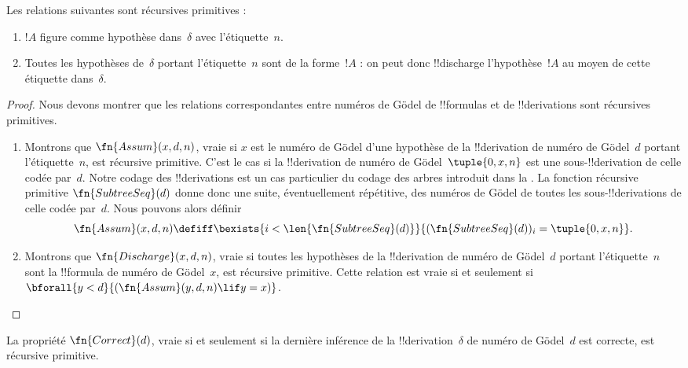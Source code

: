 \documentclass[../../../include/open-logic-section]{subfiles}
\begin{document}
\begin{prop}
  Les relations suivantes sont récursives primitives :
  \begin{enumerate}
  \item $!A$ figure comme hypothèse dans~$\delta$ avec l'étiquette~$n$.
  \item Toutes les hypothèses de~$\delta$ portant l'étiquette~$n$
    sont de la forme~$!A$ : on peut donc !!{discharge} l'hypothèse~$!A$
    au moyen de cette étiquette dans~$\delta$.
  \end{enumerate}
\end{prop}

\begin{proof}
  Nous devons montrer que les relations correspondantes entre
  numéros de G\"odel de !!{formula}s et de !!{derivation}s sont
  récursives primitives.
  \begin{enumerate}
  \item Montrons que $\fn{Assum}(x, d, n)$, vraie si $x$ est le
    numéro de G\"odel d'une hypothèse de la !!{derivation} de numéro
    de G\"odel~$d$ portant l'étiquette~$n$, est récursive
    primitive. C'est le cas si la !!{derivation} de numéro de
    G\"odel~$\tuple{0, x, n}$ est une sous-!!{derivation} de
    celle codée par~$d$. Notre codage des !!{derivation}s est un cas
    particulier du codage des arbres introduit dans la
    . La fonction récursive primitive
    $\fn{SubtreeSeq}(d)$ donne donc une suite, éventuellement répétitive,
    des numéros de G\"odel de toutes les sous-!!{derivation}s
    de celle codée par~$d$. Nous pouvons alors définir
    \[
    \fn{Assum}(x, d, n) \defiff \bexists{i<\len{\fn{SubtreeSeq}(d)}}{(\fn{SubtreeSeq}(d))_i =
      \tuple{0, x, n}}.
    \]
  \item Montrons que $\fn{Discharge}(x, d, n)$, vraie si toutes les
    hypothèses de la !!{derivation} de numéro de G\"odel~$d$ portant
    l'étiquette~$n$ sont la !!{formula} de numéro de G\"odel~$x$,
    est récursive primitive. Cette relation est vraie si et seulement
    si $\bforall{y<d}{(\fn{Assum}(y, d, n) \lif y = x)}$.
  \end{enumerate}
\end{proof}

\begin{prop}
  La propriété $\fn{Correct}(d)$, vraie si et seulement si la dernière
  inférence de la !!{derivation}~$\delta$ de numéro de G\"odel~$d$
  est correcte, est récursive primitive.
\end{prop}
\end{document}
